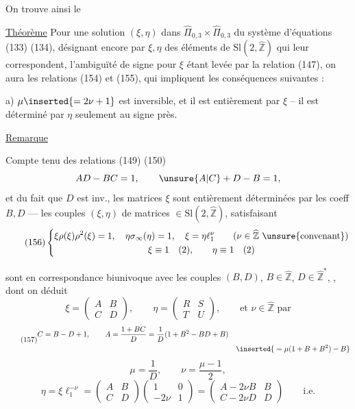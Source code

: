 On trouve ainsi le

\uline{Théorème} Pour une solution $(\xi,\eta)$ dans $\widehat{\Pi}_{0,3}\times\widehat{\Pi}_{0,3}$ du système d'équations (133) (134), désignant encore par $\xi,\eta$ des éléments de $\mathrm{Sl}(2,\widehat{\mathbb Z})$ qui leur correspondent, l'ambiguïté de signe pour $\xi$ étant levée par la relation (147), on aura les relations (154) et (155), qui impliquent les conséquences suivantes :

a) $\mu\inserted{=2\nu+1}$ est inversible, et il est entièrement  par $\xi$ -- il est déterminé par $\eta$ seulement au signe près.


\uline{Remarque}

Compte tenu des relations (149) (150)
\[
AD-BC=1,\qquad \unsure{A|C}+D-B=1,
\]
et du fait que $D$ est inv., les matrices $\xi$ sont entièrement déterminées par les coeff $B,D$ --- les couples $(\xi,\eta)$ de matrices $\in\mathrm{Sl}(2,\widehat{\mathbb Z})$, satisfaisant
\[
\tag{156}
\left\{\begin{gathered}
\xi\rho(\xi)\rho^2(\xi)=1,\quad
\eta\sigma_\infty(\eta)=1,\quad
\xi=\eta\ell_1^\nu
\qquad(\nu\in\widehat{\mathbb Z}\ \text{\unsure{convenant}})\\
\xi\equiv1\quad(2),\qquad\eta\equiv1\quad(2)
\end{gathered}\right.
\]


sont en correspondance biunivoque avec les couples $(B,D)$, $B\in\widehat{\mathbb Z}$, $D\in\widehat{\mathbb Z}^{*}$, , dont on déduit
\[
\xi=\begin{pmatrix}A&B\\C&D\end{pmatrix},\qquad
\eta=\begin{pmatrix}R&S\\T&U\end{pmatrix},\qquad
\text{et }\nu\in\widehat{\mathbb Z}\text{ par}
\]
\[
\tag{157}
\begin{aligned}
C&=B-D+1,\qquad
A=\frac{1+BC}{D}=\frac1D(1+B^2-BD+B)\\
&&\inserted{{}=\mu(1+B+B^2)-B}
\end{aligned}
\]
\[
\tag{158}
\mu=\frac1D,\qquad\nu=\frac{\mu-1}{2},
\]
\[
\eta=\xi\ell_1^{-\nu}
=\begin{pmatrix}A&B\\C&D\end{pmatrix}
\begin{pmatrix}1&0\\-2\nu&1\end{pmatrix}
=\begin{pmatrix}A-2\nu B&B\\C-2\nu D&D\end{pmatrix}
\qquad\text{i.e.}
\]

